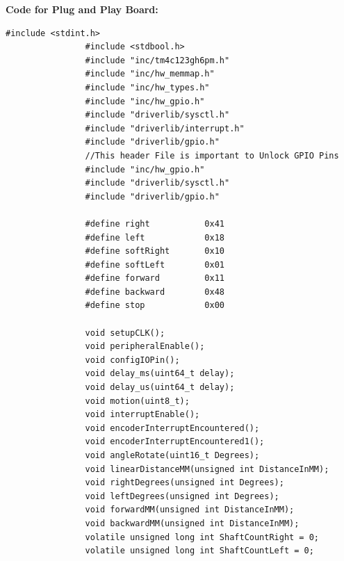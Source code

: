 \documentclass[a4paper,10pt,oneside]{article}
\begin{document}
			\textbf{Code for Plug and Play Board:}
			\begin{lstlisting}[style=CStyle]
				#include <stdint.h>
				#include <stdbool.h>
				#include "inc/tm4c123gh6pm.h"
				#include "inc/hw_memmap.h"
				#include "inc/hw_types.h"
				#include "inc/hw_gpio.h"
				#include "driverlib/sysctl.h"
				#include "driverlib/interrupt.h"
				#include "driverlib/gpio.h"
				//This header File is important to Unlock GPIO Pins
				#include "inc/hw_gpio.h"
				#include "driverlib/sysctl.h"
				#include "driverlib/gpio.h"
				
				#define right           0x41
				#define left            0x18
				#define softRight       0x10
				#define softLeft        0x01
				#define forward         0x11
				#define backward        0x48
				#define stop            0x00
				
				void setupCLK();
				void peripheralEnable();
				void configIOPin();
				void delay_ms(uint64_t delay);
				void delay_us(uint64_t delay);
				void motion(uint8_t);
				void interruptEnable();
				void encoderInterruptEncountered();
				void encoderInterruptEncountered1();
				void angleRotate(uint16_t Degrees);
				void linearDistanceMM(unsigned int DistanceInMM);
				void rightDegrees(unsigned int Degrees);
				void leftDegrees(unsigned int Degrees);
				void forwardMM(unsigned int DistanceInMM);
				void backwardMM(unsigned int DistanceInMM);
				volatile unsigned long int ShaftCountRight = 0;
				volatile unsigned long int ShaftCountLeft = 0;
				

\end{lstlisting}
\end{document}
